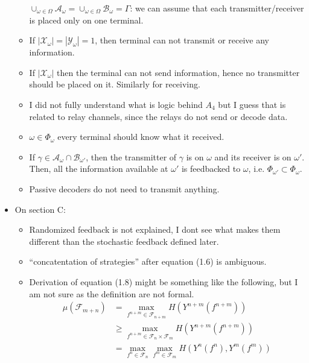 \documentclass{article}
\newcommand{\abs}[1]{\left| #1 \right|}
\begin{document}
\begin{itemize}
\begin{itemize}
		            \(\cup_{\omega \in \Omega} \mathcal{A}_{\omega} = \cup_{\omega \in \Omega } \mathcal{B}_{\omega} = \Gamma\): we can assume that each transmitter/receiver is placed only on one terminal.
		      \item If \(\abs{\mathcal{X}_{\omega}} = \abs{\mathcal{Y}_{\omega}} = 1\), then terminal can not transmit or receive any information.
		      \item If \(\abs{\mathcal{X}_{\omega}}\) then the terminal can not send information, hence no transmitter should be placed on it. Similarly for receiving.
		      \item I did not fully understand what is logic behind \(A_4\) but I guess that is related to relay channels, since the relays do not send or decode data.
		      \item \(\omega \in \Phi_{\omega}\) every terminal should know what it received.
		      \item If \(\gamma \in \mathcal{A}_{\omega} \cap \mathcal{B}_{\omega'}\), then the transmitter of \(\gamma\) is on \(\omega\) and its receiver is on \(\omega'\). Then, all the information available at \(\omega'\) is feedbacked to \(\omega\), i.e. \(\Phi_{\omega'} \subset \Phi_{\omega}\).
		      \item Passive decoders do not need to transmit anything.
	      \end{itemize}
	\item On section C:
	      \begin{itemize}
		      \item Randomized feedback is not explained, I dont see what makes them different than the stochastic feedback defined later.
		      \item ``concatentation of strategies'' after equation (1.6) is ambiguous.
		      \item Derivation of equation (1.8) might be something like the following, but I am not sure as the definition are not formal.
		            \begin{align*}
			            \mu(\mathcal{F}_{m + n}) & = \max_{f^{n + m} \in \mathcal{F}_{n + m}} H(Y^{n + m}(f^{n+ m}))                              \\
			                                     & \geq  \max_{f^{n + m} \in \mathcal{F}_n \times \mathcal{F}_m } H(Y^{n + m}(f^{n+ m}))          \\
			                                     & = \max_{f^{n} \in \mathcal{F}_n} \max_{f^m \in \mathcal{F}_m } H(Y^{n }(f^{n}) , Y^m(f^m))     \\

\end{align*}
\end{itemize}
\end{itemize}
\end{document}
